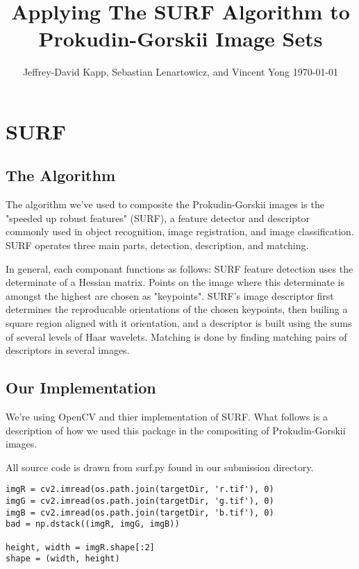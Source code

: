 \documentclass[10pt]{IEEEtran}
\title{Applying The SURF Algorithm to Prokudin-Gorskii Image Sets}
\author{Jeffrey-David Kapp, Sebastian Lenartowicz, and Vincent Yong
\linebreak
\today}
\begin{document}
\maketitle



\section{SURF}

\subsection{The Algorithm}

The algorithm we've used to composite the Prokudin-Gorskii images is the "speeded up robust features" (SURF), a feature detector and descriptor commonly used in object recognition, image registration, and image classification. SURF operates three main parts, detection, description, and matching.
\linebreak

In general, each componant functions as follows: SURF feature detection uses the determinate of a Hessian matrix. Points on the image where this determinate is amongst the highest are chosen as "keypoints". SURF's image descriptor first determines the reproducable orientations of the chosen keypoints, then builing a square region aligned with it orientation, and a descriptor is built using the sums of several levels of Haar wavelets. Matching is done by finding matching pairs of descriptors in several images. 

\subsection{Our Implementation}

We're using OpenCV and thier implementation of SURF. What follows is a description of how we used this package in the compositing of Prokudin-Gorskii images.

All source code is drawn from surf.py found in our submission directory. 

\begin{lstlisting}
imgR = cv2.imread(os.path.join(targetDir, 'r.tif'), 0)
imgG = cv2.imread(os.path.join(targetDir, 'g.tif'), 0)
imgB = cv2.imread(os.path.join(targetDir, 'b.tif'), 0)
bad = np.dstack((imgR, imgG, imgB))

height, width = imgR.shape[:2]
shape = (width, height)
\end{lstlisting}
\end{document}
